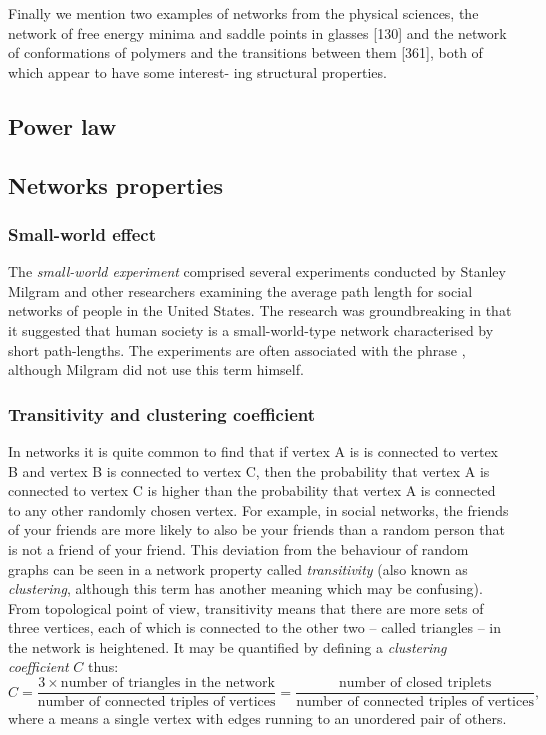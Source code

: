       Finally we mention two examples of networks from the physical sciences, the network of free energy minima and saddle points in glasses [130] and the network of conformations of polymers and the transitions between them [361], both of which appear to have some interest- ing structural properties.
      
  \subsection{Power law}
    
  \subsection{Networks properties}
    
    \subsubsection{Small-world effect}
      
      The \emph{small-world experiment} comprised several experiments conducted by Stanley Milgram and other researchers examining the average path length for social networks of people in the United States. The research was groundbreaking in that it suggested that human society is a small-world-type network characterised by short path-lengths. The experiments are often associated with the phrase , although Milgram did not use this term himself.
      
    \subsubsection{Transitivity and clustering coefficient}
    
      In networks it is quite common to find that if vertex A is is connected to vertex B and vertex B is connected to vertex C, then the probability that vertex A is connected to vertex C is higher than the probability that vertex A is connected to any other randomly chosen vertex. For example, in social networks, the friends of your friends are more likely to also be your friends than a random person that is not a friend of your friend. This deviation from the behaviour of random graphs can be seen in a network property called \emph{transitivity} (also known as \emph{clustering}, although this term has another meaning which may be confusing). From topological point of view, transitivity means that there are more sets of three vertices, each of which is connected to the other two -- called triangles -- in the network is heightened. It may be quantified by defining a \emph{clustering coefficient} $C$ thus:
      \[ C = \frac{3 \times \mbox{number of triangles in the network}}{\mbox{number of connected triples of vertices}} = \frac{\mbox{number of closed triplets}}{\mbox{number of connected triples of vertices}} \mbox{,} \]
      where a  means a single vertex with edges running to an unordered pair of others.

